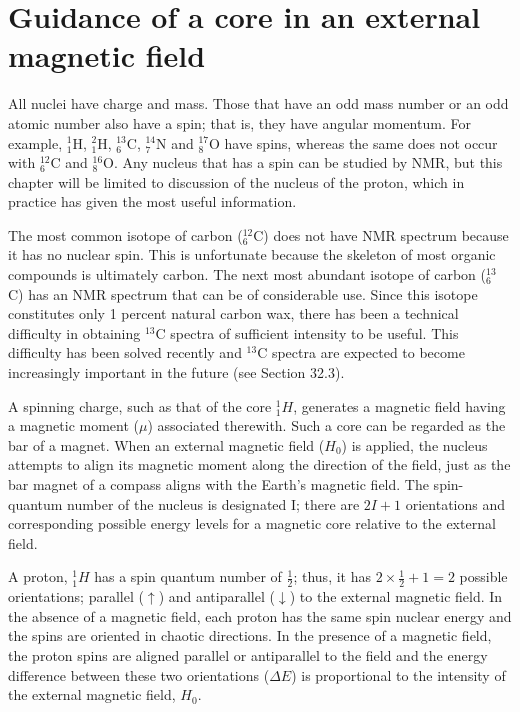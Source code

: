\section{Guidance of a core in an external magnetic field}
All nuclei have charge and mass. Those that have an odd mass number or an odd atomic number also have a spin; that is, they have angular momentum. For example, $^1_1$H, $^2_1$H, $^{13}_6$C, $^{14}_7$N and $^{17}_8$O have spins, whereas the same does not occur with $^{12}_6$C and $^{16}_8$O. Any nucleus that has a spin can be studied by NMR, but this chapter will be limited to discussion of the nucleus of the proton, which in practice has given the most useful information.

The most common isotope of carbon ($^{12}_6$C) does not have NMR spectrum because it has no nuclear spin. This is unfortunate because the skeleton of most organic compounds is ultimately carbon. The next most abundant isotope of carbon ($^{13}_6$C) has an NMR spectrum that can be of considerable use. Since this isotope constitutes only 1 percent natural carbon wax, there has been a technical difficulty in obtaining $^{13}$C spectra of sufficient intensity to be useful. This difficulty has been solved recently and $^{13}$C spectra are expected to become increasingly important in the future (see Section 32.3).

A spinning charge, such as that of the core $^1_1H$, generates a magnetic field having a magnetic moment ($\mu$) associated therewith. Such a core can be regarded as the bar of a magnet. When an external magnetic field ($H_0$) is applied, the nucleus attempts to align its magnetic moment along the direction of the field, just as the bar magnet of a compass aligns with the Earth's magnetic field. The spin-quantum number of the nucleus is designated I; there are $2I+1$ orientations and corresponding possible energy levels for a magnetic core relative to the external field.

A proton, $^1_1H$ has a spin quantum number of $\frac{1}{2}$; thus, it has $2\times\frac{1}{2}+1=2$ possible orientations; parallel ($\uparrow$) and antiparallel ($\downarrow$) to the external magnetic field. In the absence of a magnetic field, each proton has the same spin nuclear energy and the spins are oriented in chaotic directions. In the presence of a magnetic field, the proton spins are aligned parallel or antiparallel to the field and the energy difference between these two orientations ($\Delta E$) is proportional to the intensity of the external magnetic field, $H_0$.


